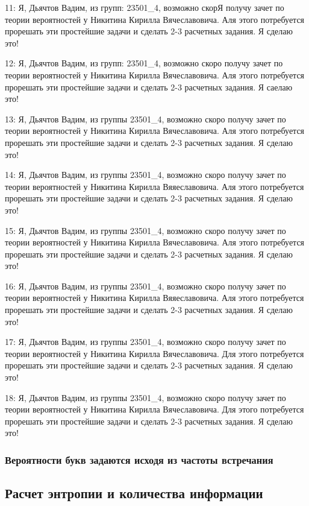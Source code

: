 {11: Я, Дьячтов Вадим, из групп: 23501\_4, возможно скорЯ получу зачет по теории вероятностей у Никитина Кирилла Вячеславовича. Аля этого потребуется прорешать эти простейшие задачи и сделать 2-3 расчетных задания. Я сделаю это!

12: Я, Дьячтов Вадим, из групп: 23501\_4, возможно скоро получу зачет по теории вероятностей у Никитина Кирилла Вячеславовича. Аля этого потребуется прорешать эти простейшие задачи и сделать 2-3 расчетных задания. Я саелаю это!

13: Я, Дьячтов Вадим, из группы 23501\_4, возможно скоро получу зачет по теории вероятностей у Никитина Кирилла Вячеславовича. Аля этого потребуется прорешать эти простейшие задачи и сделать 2-3 расчетных задания. Я сделаю это!

14: Я, Дьячтов Вадим, из группы 23501\_4, возможно скоро получу зачет по теории вероятностей у Никитина Кирилла Вяяеславовича. Аля этого потребуется прорешать эти простейшие задачи и сделать 2-3 расчетных задания. Я сделаю это!

15: Я, Дьячтов Вадим, из группы 23501\_4, возможно скоро получу зачет по теории вероятностей у Никитина Кирилла Вячеславовича. Аля этого потребуется прорешать эти простейшие задачи и сделать 2-3 расчетных задания. Я сделаю это!

16: Я, Дьячтов Вадим, из группы 23501\_4, возможно скоро получу зачет по теории вероятностей у Никитина Кирилла Вяяеславовича. Аля этого потребуется прорешать эти простейшие задачи и сделать 2-3 расчетных задания. Я сделаю это!

17: Я, Дьячтов Вадим, из группы 23501\_4, возможно скоро получу зачет по теории вероятностей у Никитина Кирилла Вячеславовича. Для этого потребуется прорешать эти простейшие задачи и сделать 2-3 расчетных задания. Я сделаю это!

18: Я, Дьячтов Вадим, из группы 23501\_4, возможно скоро получу зачет по теории вероятностей у Никитина Кирилла Вячеславовича. Для этого потребуется прорешать эти простейшие задачи и сделать 2-3 расчетных задания. Я сделаю это!

}

\subsubsection{Вероятности букв задаются исходя из частоты встречания}

\subsection{Расчет энтропии и количества информации}

